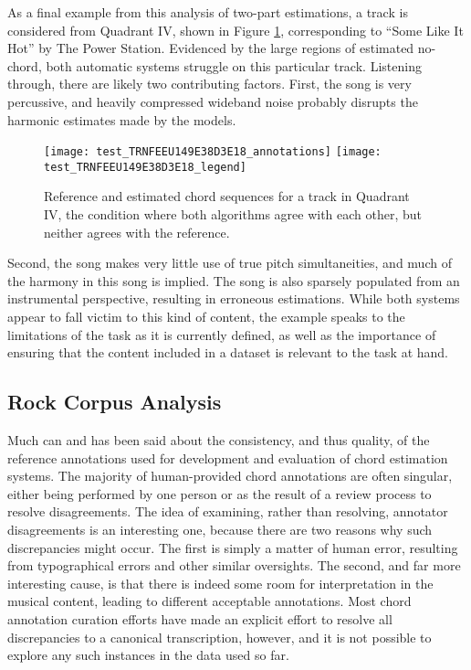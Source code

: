 As a final example from this analysis of two-part estimations, a track is considered from Quadrant IV, shown in Figure \ref{fig:test_quadIV}, corresponding to ``Some Like It Hot'' by The Power Station.
Evidenced by the large regions of estimated no-chord, both automatic systems struggle on this particular track.
Listening through, there are likely two contributing factors.
First, the song is very percussive, and heavily compressed wideband noise probably disrupts the harmonic estimates made by the models.
\begin{figure}[t!]
\centering
\texttt{[image: test\_TRNFEEU149E38D3E18\_annotations]}
\texttt{[image: test\_TRNFEEU149E38D3E18\_legend]}
\caption{Reference and estimated chord sequences for a track in Quadrant IV, the condition where both algorithms agree with each other, but neither agrees with the reference.}
\label{fig:test_quadIV}
\end{figure}
Second, the song makes very little use of true pitch simultaneities, and much of the harmony in this song is implied.
The song is also sparsely populated from an instrumental perspective, resulting in erroneous estimations.
While both systems appear to fall victim to this kind of content, the example speaks to the limitations of the task as it is currently defined, as well as the importance of ensuring that the content included in a dataset is relevant to the task at hand.


\subsection{Rock Corpus Analysis}
\label{subsec:qualitative_analysis}

Much can and has been said about the consistency, and thus quality, of the reference annotations used for development and evaluation of chord estimation systems.
The majority of human-provided chord annotations are often singular, either being performed by one person or as the result of a review process to resolve disagreements.
The idea of examining, rather than resolving, annotator disagreements is an interesting one, because there are two reasons why such discrepancies might occur.
The first is simply a matter of human error, resulting from typographical errors and other similar oversights.
The second, and far more interesting cause, is that there is indeed some room for interpretation in the musical content, leading to different acceptable annotations.
Most chord annotation curation efforts have made an explicit effort to resolve all discrepancies to a canonical transcription, however, and it is not possible to explore any such instances in the data used so far.



